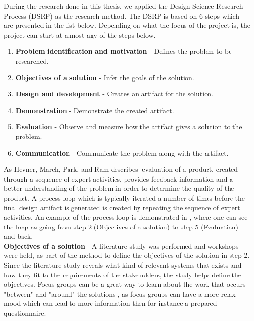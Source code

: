 During the research done in this thesis, we applied the Design Science Research 
Process (DSRP) as the research method. The DSRP is based on 6 steps which are 
presented in the list below. Depending on what the focus of the project is, 
the project can start at almost any of the steps below. \cite{peffers2006design}

\begin{enumerate}
	\item \textbf{Problem identification and motivation} - Defines the problem to be
	researched. 
	\item \textbf{Objectives of a solution} - Infer the goals of the solution.
	\item \textbf{Design and development} - Creates an artifact for the solution.
	\item \textbf{Demonstration} - Demonstrate the created artifact.
	\item \textbf{Evaluation} - Observe and measure how the artifact gives a 
	solution to the problem.
	\item \textbf{Communication} - Communicate the problem along with the artifact.
\end{enumerate}

As Hevner, March, Park, and Ram \cite{von2004design} describes, 
evaluation of a product, created through a sequence of expert activities, 
provides feedback information and a better understanding of the problem in 
order to determine the quality of the product. A process loop which is typically 
iterated a number of times before the final design artifact is generated is created 
by repeating the sequence of expert activities. An example of the process loop 
is demonstrated in , where one can see the loop as going 
from step 2 (Objectives of a solution) to step 5 (Evaluation) and back.\\

\textbf{Objectives of a solution} - A literature study was performed and workshops were held, as part of the 
method to define the objectives of the solution in step 2. Since the literature study 
reveals what kind of relevant systems that exists and how they fit to the
requirements of the stakeholders, the study helps define the objectives. Focus
groups can be a great way to learn about the work that occurs "between" and 
"around" the solutions \cite{FocusGroupstoStudyWorkPractice}, as focus groups
can have a more relax mood which can lead to more information then for 
instance a prepared questionnaire.\\


